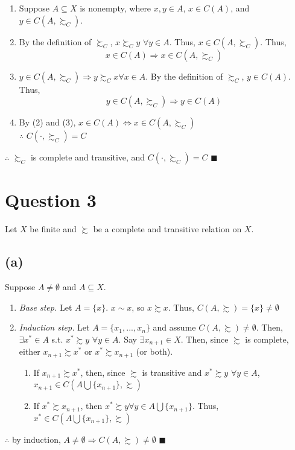 \documentclass{article}
\newcommand{\union}{\bigcup}
\begin{document}
\begin{enumerate}
	\item Suppose $A\subseteq X$ is nonempty, where $x,y\in A$, $x\in C(A)$, and ${y\in C(A,\succsim_C)}$.
	
	\item By the definition of $\succsim_C$, $x\succsim_C y$ $\forall y\in A$. Thus, $x\in C\left(A,\succsim_C\right)$.  Thus, 
		\[
			x\in C(A)\Rightarrow x\in C\left(A,\succsim_C\right)
		\]
	
	\item $y\in C\left(A,\succsim_C\right)\Rightarrow y\succsim_C x \forall x\in A$.  By the definition of $\succsim_C$, $y\in C(A)$. Thus, 
		\[
			y\in C\left(A,\succsim_C\right)\Rightarrow y\in C(A)
		\]
	
	\item By (2) and (3), $x\in C(A)\iff x\in C\left(A,\succsim_C\right)$
	\medskip \\
	$\therefore$  $C\left(\cdot,\succsim_C\right) = C$
	
\end{enumerate}
$\therefore$ $\succsim_C$ is complete and transitive, and $C\left(\cdot,\succsim_C\right) = C$ $\blacksquare$

\pagebreak 
\section*{Question 3}
Let $X$ be finite and $\succsim$ be a complete and transitive relation on $X$.

\subsection*{(a)}
Suppose $A\neq\emptyset$ and $A\subseteq X$.
\begin{enumerate}
	\item \textit{Base step.} Let $A=\{x\}$. $x\sim x$, so $x\succsim x$. Thus, $C(A,\succsim)=\{x\}\neq\emptyset$
	
	\item \textit{Induction step.} Let $A=\{x_1,...,x_n\}$ and assume $C(A,\succsim)\neq\emptyset$. Then, $\exists x^*\in A$ s.t. $x^*\succsim y$ $\forall y\in A$. Say $\exists x_{n+1}\in X$. Then, since $\succsim$ is complete, either $x_{n+1}\succsim x^*$ or $x^*\succsim x_{n+1}$ (or both).
		\begin{enumerate}
			\item If $x_{n+1}\succsim x^*$, then, since $\succsim$ is transitive and $x^*\succsim y$ $\forall y\in A$, ${x_{n+1}\in C(A\union\{x_{n+1}\},\succsim)}$
			\item If $x^*\succsim x_{n+1}$, then $x^*\succsim y\forall y\in A\union\{x_{n+1}\}$. Thus, ${x^*\in C(A\union\{x_{n+1}\},\succsim)}$
		\end{enumerate}
\end{enumerate}
$\therefore$ by induction, $A\neq\emptyset\Rightarrow C(A,\succsim)\neq\emptyset$ $\blacksquare$
\end{document}
